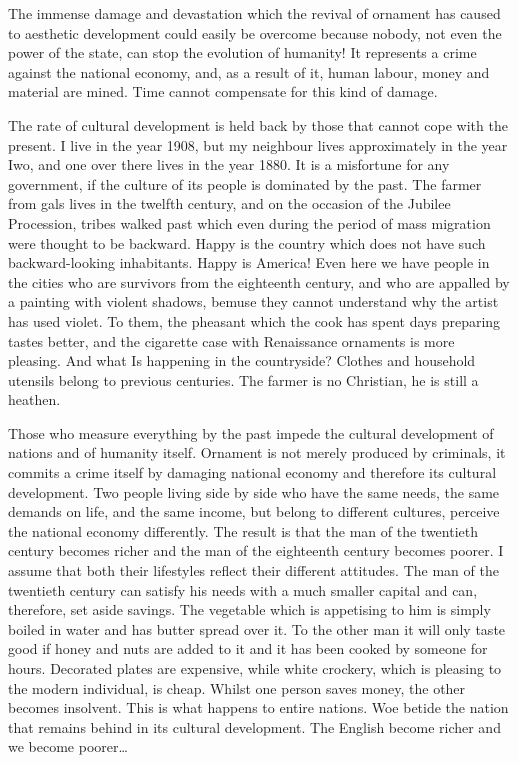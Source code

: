 \documentclass[a4paper]{article}
\begin{document}
The immense damage and devastation which the revival of ornament has caused to aesthetic development could easily be overcome because nobody, not even the power of the state, can stop the evolution of humanity! It represents a crime against the national economy, and, as a result of it, human labour, money and material are mined. Time cannot compensate for this kind of damage.

The rate of cultural development is held back by those that cannot cope with the present. I live in the year 1908, but my neighbour lives approximately in the year Iwo, and one over there lives in the year 1880. It is a misfortune for any government, if the culture of its people is dominated by the past. The farmer from gals lives in the twelfth century, and on the occasion of the Jubilee Procession, tribes walked past which even during the period of mass migration were thought to be backward. Happy is the country which does not have such backward-looking inhabitants. Happy is America! Even here we have people in the cities who are survivors from the eighteenth century, and who are appalled by a painting with violent shadows, bemuse they cannot understand why the artist has used violet. To them, the pheasant which the cook has spent days preparing tastes better, and the cigarette case with Renaissance ornaments is more pleasing. And what Is happening in the countryside? Clothes and household utensils belong to previous centuries. The farmer is no Christian, he is still a heathen.

Those who measure everything by the past impede the cultural development of nations and of humanity itself. Ornament is not merely produced by criminals, it commits a crime itself by damaging national economy and therefore its cultural development. Two people living side by side who have the same needs, the same demands on life, and the same income, but belong to different cultures, perceive the national economy differently. The result is that the man of the twentieth century becomes richer and the man of the eighteenth century becomes poorer. I assume that both their lifestyles reflect their different attitudes. The man of the twentieth century can satisfy his needs with a much smaller capital and can, therefore, set aside savings. The vegetable which is appetising to him is simply boiled in water and has butter spread over it. To the other man it will only taste good if honey and nuts are added to it and it has been cooked by someone for hours. Decorated plates are expensive, while white crockery, which is pleasing to the modern individual, is cheap. Whilst one person saves money, the other becomes insolvent. This is what happens to entire nations. Woe betide the nation that remains behind in its cultural development. The English become richer and we become poorer…
\end{document}

